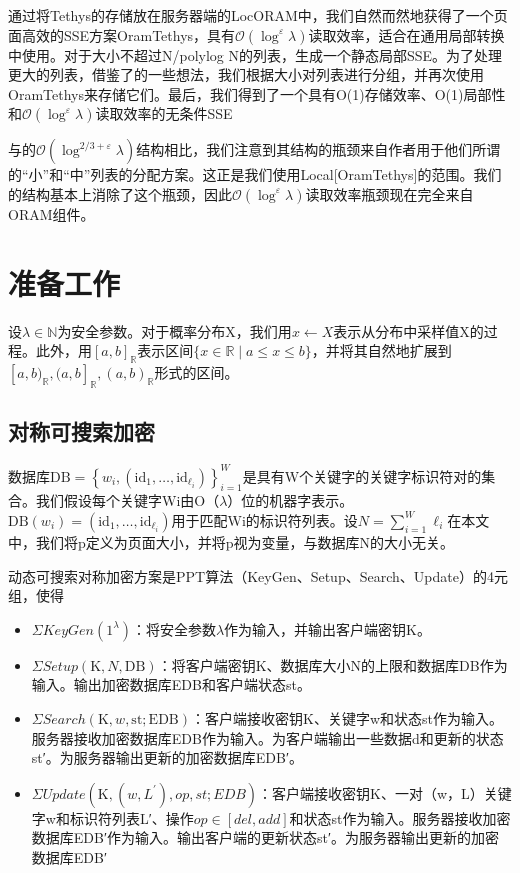 \documentclass[UTF8]{article}
\begin{document}
通过将Tethys的存储放在服务器端的LocORAM中，我们自然而然地获得了一个页面高效的SSE方案OramTethys，具有$\mathcal{O}\left(\log ^{\varepsilon} \lambda\right)$读取效率，适合在通用局部转换中使用。对于大小不超过N/polylog N的列表，生成一个静态局部SSE。为了处理更大的列表，借鉴了\cite{IoannisDemertzis2018SearchableEW}的一些想法，我们根据大小对列表进行分组，并再次使用OramTethys来存储它们。最后，我们得到了一个具有O(1)存储效率、O(1)局部性和$\mathcal{O}\left(\log ^{\varepsilon} \lambda\right)$读取效率的无条件SSE

与\cite{IoannisDemertzis2018SearchableEW}的$\mathcal{O}\left(\log ^{2 / 3+\varepsilon} \lambda\right)$结构相比，我们注意到其结构的瓶颈来自作者用于他们所谓的“小”和“中”列表的分配方案。这正是我们使用Local[OramTethys]的范围。我们的结构基本上消除了这个瓶颈，因此$\mathcal{O}\left(\log ^{\varepsilon} \lambda\right)$读取效率瓶颈现在完全来自ORAM组件。
\section{准备工作}
设$\lambda \in \mathbb{N}$为安全参数。对于概率分布X，我们用$x \leftarrow X$表示从分布中采样值X的过程。此外，用$[a, b]_{\mathbb{R}}$表示区间$\{x \in \mathbb{R} \mid a \leq x \leq b\}$，并将其自然地扩展到$[a, b)_{\mathbb{R}},(a, b]_{\mathbb{R}},(a, b)_{\mathbb{R}}$形式的区间。
\subsection{对称可搜索加密}
数据库$\mathrm{DB}=\left\{w_{i},\left(\mathrm{id}_{1}, \ldots, \mathrm{id}_{\ell_{i}}\right)\right\}_{i=1}^{W}$是具有W个关键字的关键字标识符对的集合。我们假设每个关键字Wi由O（$\lambda$）位的机器字表示。$\mathrm{DB}\left(w_{i}\right)=\left(\mathrm{id}_{1}, \ldots, \mathrm{id}_{\ell_{i}}\right)$用于匹配Wi的标识符列表。设$N=\sum_{i=1}^{W} \ell_{i}$在本文中，我们将p定义为页面大小，并将p视为变量，与数据库N的大小无关。

动态可搜索对称加密方案是PPT算法（KeyGen、Setup、Search、Update）的4元组，使得

\begin{itemize}
  \item $\Sigma{KeyGen}\left(1^{\lambda}\right)$：将安全参数$\lambda$作为输入，并输出客户端密钥K。
  \item $\Sigma { Setup }(\mathrm{K}, N, \mathrm{DB})$：将客户端密钥K、数据库大小N的上限和数据库DB作为输入。输出加密数据库EDB和客户端状态st。
  \item $\Sigma{Search}(\mathrm{K}, w, \mathrm{st} ; \mathrm{EDB})$：客户端接收密钥K、关键字w和状态st作为输入。服务器接收加密数据库EDB作为输入。为客户端输出一些数据d和更新的状态st′。为服务器输出更新的加密数据库EDB′。
  \item $\Sigma { Update }\left(\mathrm{K},\left(w, L^{\prime}\right), { op, st; EDB }\right)$：客户端接收密钥K、一对（w，L）关键字w和标识符列表L′、操作${ op } \in{  [del, add] }$和状态st作为输入。服务器接收加密数据库EDB′作为输入。输出客户端的更新状态st′。为服务器输出更新的加密数据库EDB′
\end{itemize}
\end{document}
